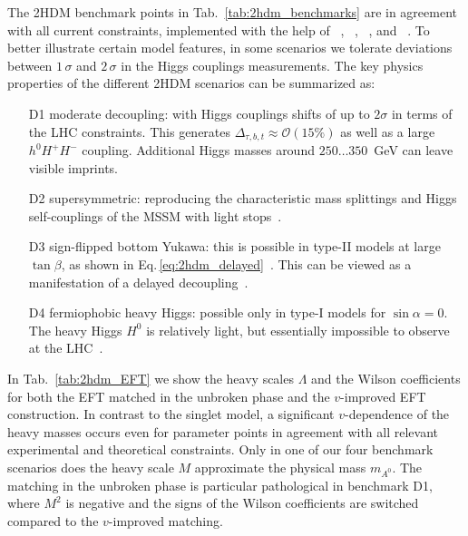 The 2HDM benchmark points in Tab.~\ref{tab:2hdm_benchmarks} are in
agreement with all current constraints, implemented with the help of
~\cite{2hdmc},
~\cite{higgsbounds},
~\cite{superiso}, and
~\cite{higgssignals}. To better illustrate
certain model features, in some scenarios we tolerate deviations
between $1\,\sigma$ and $2\,\sigma$ in the Higgs couplings
measurements.  The key physics properties of the different 2HDM
scenarios can be summarized as:
%
\begin{itemize}
\item[D1] moderate decoupling: with Higgs couplings shifts of up to
$2\sigma$ in terms of the LHC constraints.  This generates
$\Delta_{\tau,b,t} \approx \mathcal{O}(15\%)$ as well as a large $h^0
H^+ H^-$ coupling. Additional Higgs masses around $250\dots350$~GeV
can leave visible imprints.
\item[D2] supersymmetric: reproducing the characteristic mass
splittings and Higgs self-couplings of the MSSM with light
stops~\cite{Carena:2013qia}.
\item[D3] sign-flipped bottom Yukawa: this is possible in type-II
models at large $\tan\beta$, as shown in
Eq.\,\eqref{eq:2hdm_delayed}~\cite{Ferreira:2014naa}. This can be
viewed as a manifestation of a delayed decoupling~\cite{Haber:2000kq}.
\item[D4] fermiophobic heavy Higgs: possible only in type-I models for
$\sin\alpha =0$. The heavy Higgs $H^0$ is relatively light, but
essentially impossible to observe at the LHC~\cite{Hespel:2014sla,
fermiophobic}.
\end{itemize}
%
In Tab.~\ref{tab:2hdm_EFT} we show the heavy scales $\Lambda$ and the
Wilson coefficients for both the EFT matched in the unbroken phase and
the $v$-improved EFT construction. In contrast to the singlet model, a
significant $v$-dependence of the heavy masses occurs even for
parameter points in agreement with all relevant experimental and
theoretical constraints. Only in one of our four benchmark scenarios
does the heavy scale $M$ approximate the physical mass $m_{A^0}$. The
matching in the unbroken phase is particular pathological in benchmark
D1, where $M^2$ is negative and the signs of the Wilson coefficients
are switched compared to the $v$-improved matching.

